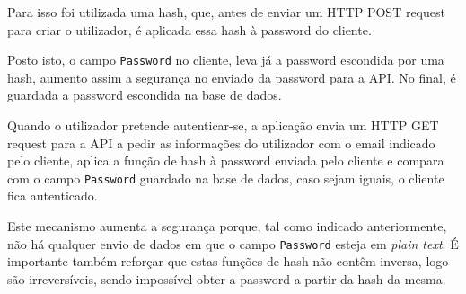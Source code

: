 Para isso foi utilizada uma hash, que, antes de enviar um HTTP POST request para criar o utilizador, é aplicada essa hash à password do cliente.

Posto isto, o campo \texttt{Password} no cliente, leva já a password escondida por uma hash, aumento assim a segurança no enviado da password para a API. No final, é guardada a password escondida na base de dados.

Quando o utilizador pretende autenticar-se, a aplicação envia um HTTP GET request para a API a pedir as informações do utilizador com o email indicado pelo cliente, aplica a função de hash à password enviada pelo cliente e compara com o campo \texttt{Password} guardado na base de dados, caso sejam iguais, o cliente fica autenticado.

Este mecanismo aumenta a segurança porque, tal como indicado anteriormente, não há qualquer envio de dados em que o campo \texttt{Password} esteja em \textit{plain text}. É importante também reforçar que estas funções de hash não contêm inversa, logo são irreversíveis, sendo impossível obter a password a partir da hash da mesma.